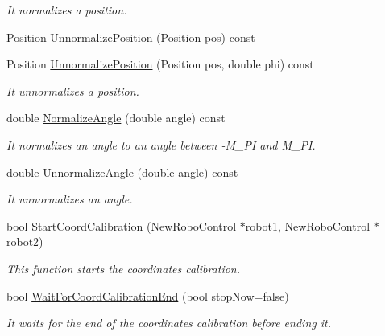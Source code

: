 \begin{DoxyCompactItemize}
\begin{DoxyCompactList}\small\item\em It normalizes a position. \item\end{DoxyCompactList}\item 
Position \hyperlink{classCoordinatesCalibrer_a8522193b13196313d001c589e7845bd3}{UnnormalizePosition} (Position pos) const 
\item 
Position \hyperlink{classCoordinatesCalibrer_a19035a69d4d571e5e1d4baa4ba10baee}{UnnormalizePosition} (Position pos, double phi) const 
\begin{DoxyCompactList}\small\item\em It unnormalizes a position. \item\end{DoxyCompactList}\item 
double \hyperlink{classCoordinatesCalibrer_acae6b5f07cf198f9c85a1b09e9a275dc}{NormalizeAngle} (double angle) const 
\begin{DoxyCompactList}\small\item\em It normalizes an angle to an angle between -\/M\_\-PI and M\_\-PI. \item\end{DoxyCompactList}\item 
double \hyperlink{classCoordinatesCalibrer_ab97fd4d3f3930aaff39cee1543022cb6}{UnnormalizeAngle} (double angle) const 
\begin{DoxyCompactList}\small\item\em It unnormalizes an angle. \item\end{DoxyCompactList}\item 
bool \hyperlink{classCoordinatesCalibrer_a2087994adbb8651efcb06e3d7a2315da}{StartCoordCalibration} (\hyperlink{classNewRoboControl}{NewRoboControl} $\ast$robot1, \hyperlink{classNewRoboControl}{NewRoboControl} $\ast$robot2)
\begin{DoxyCompactList}\small\item\em This function starts the coordinates calibration. \item\end{DoxyCompactList}\item 
bool \hyperlink{classCoordinatesCalibrer_a99563ba6e43f839bf1b10f55cf155125}{WaitForCoordCalibrationEnd} (bool stopNow=false)
\begin{DoxyCompactList}\small\item\em It waits for the end of the coordinates calibration before ending it. \item\end{DoxyCompactList}\item 

\end{DoxyCompactItemize}
